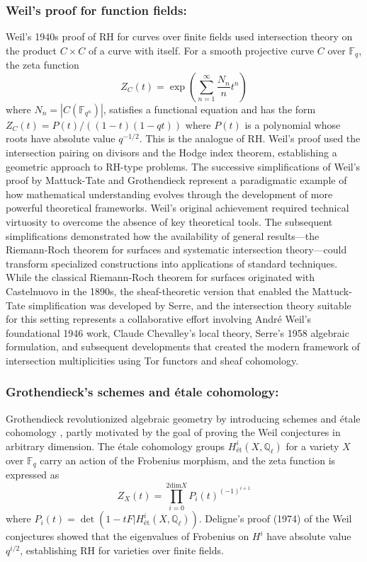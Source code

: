 \documentclass{article}
\def\dim{{\mbox{dim}}}
\begin{document}
\subsubsection{Weil's proof for function fields:} Weil's 1940s proof of RH for curves over finite fields used intersection theory on the product $C \times C$ of a curve with itself. For a smooth projective curve $C$ over $\mathbb{F}_q$, the zeta function
    \[
    Z_C(t) = \exp\left(\sum_{n=1}^{\infty} \frac{N_n}{n}t^n\right)
    \]
    where $N_n = |C(\mathbb{F}_{q^n})|$, satisfies a functional equation and has the form $Z_C(t) = P(t)/((1-t)(1-qt))$ where $P(t)$ is a polynomial whose roots have absolute value $q^{-1/2}$. This is the analogue of RH. Weil's proof used the intersection pairing on divisors and the Hodge index theorem, establishing a geometric approach to RH-type problems.  The successive simplifications of Weil's proof  by Mattuck-Tate and Grothendieck represent a paradigmatic example of how mathematical understanding evolves through the development of more powerful theoretical frameworks. Weil's original achievement required  technical virtuosity to overcome the absence of key theoretical tools. The subsequent simplifications demonstrated how the availability of general results—the Riemann-Roch theorem for surfaces
 and systematic intersection theory—could transform specialized constructions into applications of standard techniques. While the classical Riemann-Roch theorem for surfaces originated with Castelnuovo in the 1890s, the sheaf-theoretic version that enabled the Mattuck-Tate simplification was developed by Serre, and the intersection theory suitable for this setting represents a collaborative effort involving André Weil's foundational 1946 work, Claude Chevalley's local theory, Serre's 1958 algebraic formulation, and subsequent developments that created the modern framework of intersection multiplicities using Tor functors and sheaf cohomology.  


   \subsubsection{Grothendieck's schemes and étale cohomology:} Grothendieck revolutionized algebraic geometry by introducing schemes and  étale cohomology \cite{ArtinGrothendieckVerdier}, partly motivated by the goal of proving the Weil conjectures in arbitrary dimension.  The étale cohomology groups $H^i_{\text{ét}}(X, \mathbb{Q}_{\ell})$ for a variety $X$ over $\mathbb{F}_q$ carry an action of the Frobenius morphism, and the zeta function is expressed as
    \[
    Z_X(t) = \prod_{i=0}^{2\dim X} P_i(t)^{(-1)^{i+1}}
    \]
    where $P_i(t) = \det(1 - tF | H^i_{\text{ét}}(X, \mathbb{Q}_{\ell}))$. Deligne's proof (1974) of the Weil conjectures showed that the eigenvalues of Frobenius on $H^i$ have absolute value $q^{i/2}$, establishing RH for varieties over finite fields.\newline
      
\end{document}
